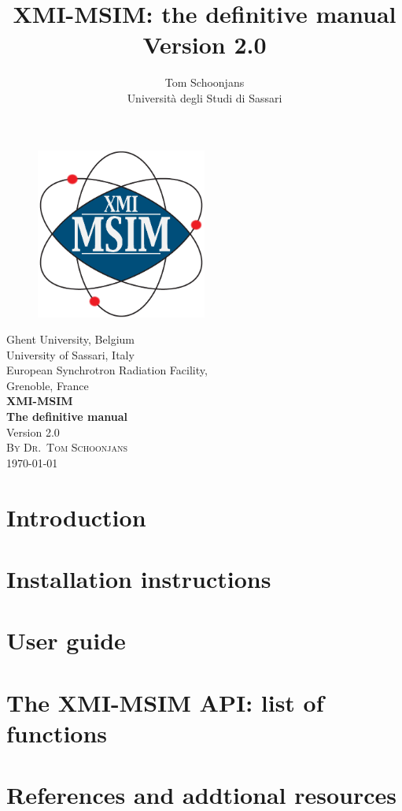 \documentclass[11pt,a4paper,oneside,titlepage]{article}
\title{XMI-MSIM: the definitive manual\\\small{Version 2.0}}
\author{Tom Schoonjans\\Universit\`a degli Studi di Sassari}
\begin{document}
\begin{titlepage}
\begin{center}
\begin{figure}
\begin{center}
\includegraphics[width=0.5\textwidth]{Logo_xmi_msim.png}
\end{center}
\end{figure}
\vspace{1cm}
\Large{Ghent University, Belgium\\}
\vspace{0.7cm}
\Large{University of Sassari, Italy\\}
\vspace{0.7cm}
\Large{European Synchrotron Radiation Facility,\\Grenoble, France\\}
\vspace{1.5cm}
\Huge{\bfseries{XMI-MSIM\\}}
\vspace{1.5cm}
\huge{\bfseries{The definitive manual\\}}
\vspace{1.5cm}
\Large{Version 2.0\\}
\vspace{1.5cm}
\textsc{\large{By Dr.~Tom Schoonjans\\}}
\vfill
{\large \today}
\end{center}
\end{titlepage}


\tableofcontents
\newpage

\section{Introduction}


\section{Installation instructions}

\section{User guide}

\section{The XMI-MSIM API: list of functions}

\section{References and addtional resources}

\end{document}
